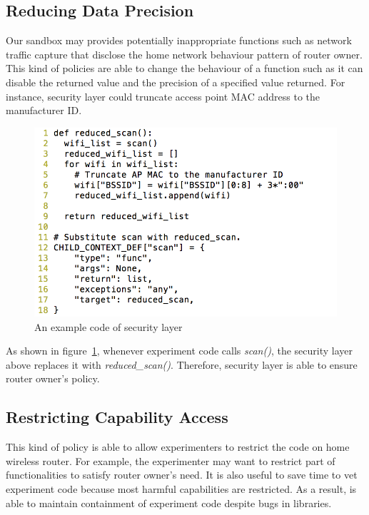\subsection{Reducing Data Precision}
Our sandbox may provides potentially inappropriate functions such as network traffic capture that disclose the home network behaviour pattern of router owner. This kind of policies are able to change the behaviour of a function such as it can disable the returned value and the precision of a specified value returned. For instance, security layer could truncate access point MAC address to the manufacturer ID.

\begin{figure}%
\centering
\includegraphics[width=0.8\columnwidth]{figure/example.png}
\caption{An example code of security layer}
\label{fig-examplecode}
\end{figure}

As shown in figure~\ref{fig-examplecode}, whenever experiment code calls \textit{scan()}, the security layer above replaces it with \textit{reduced\_scan()}. Therefore, security layer is able to ensure router owner's policy.

\subsection{Restricting Capability Access}
This kind of policy is able to allow experimenters to restrict the code on home wireless router. For example, the experimenter may want to restrict part of functionalities to satisfy router owner's need. It is also useful to save time to vet experiment code because most harmful capabilities are restricted. As a result, \sysname is able to maintain containment of experiment code despite bugs in libraries.
 